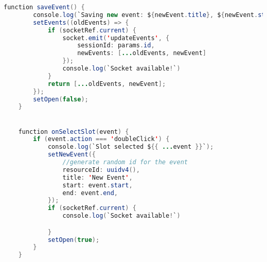 \begin{lstlisting}[language=Java, caption={Calendar Page}, label={lst:java}]
    function saveEvent() {
        console.log(`Saving new event: ${newEvent.title}, ${newEvent.start}, ${newEvent.end} `);
        setEvents((oldEvents) => {
            if (socketRef.current) {
                socket.emit('updateEvents', {
                    sessionId: params.id,
                    newEvents: [...oldEvents, newEvent]
                });
                console.log(`Socket available!`)
            }
            return [...oldEvents, newEvent];
        });
        setOpen(false);
    }


    function onSelectSlot(event) {
        if (event.action === 'doubleClick') {
            console.log(`Slot selected ${{ ...event }}`);
            setNewEvent({
                //generate random id for the event
                resourceId: uuidv4(),
                title: 'New Event',
                start: event.start,
                end: event.end,
            });
            if (socketRef.current) {
                console.log(`Socket available!`)

            }
            setOpen(true);
        }
    }


\end{lstlisting}
